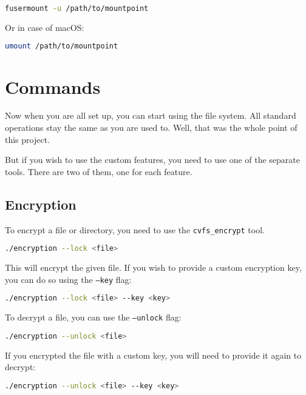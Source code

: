\begin{lstlisting}[language=bash, basicstyle=\ttfamily\small]
  fusermount -u /path/to/mountpoint
\end{lstlisting}

Or in case of macOS:

\begin{lstlisting}[language=bash, basicstyle=\ttfamily\small]
    umount /path/to/mountpoint
\end{lstlisting}

\section*{Commands}

Now when you are all set up, you can start using the file system.
All standard operations stay the same as you are used to.
Well, that was the whole point of this project.

But if you wish to use the custom features, you need to use one of the separate tools.
There are two of them, one for each feature.

\subsection*{Encryption}

To encrypt a file or directory, you need to use the \texttt{cvfs\_encrypt} tool.

\begin{lstlisting}[language=bash, basicstyle=\ttfamily\small]
./encryption --lock <file>
\end{lstlisting}

This will encrypt the given file.
If you wish to provide a custom encryption key, you can do so using the \texttt{--key} flag:

\begin{lstlisting}[language=bash, basicstyle=\ttfamily\small]
./encryption --lock <file> --key <key>
\end{lstlisting}

To decrypt a file, you can use the \texttt{--unlock} flag:

\begin{lstlisting}[language=bash, basicstyle=\ttfamily\small]
./encryption --unlock <file>
\end{lstlisting}

If you encrypted the file with a custom key, you will need to provide it again to decrypt:

\begin{lstlisting}[language=bash, basicstyle=\ttfamily\small]
./encryption --unlock <file> --key <key>
\end{lstlisting}

